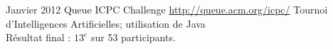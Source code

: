 \documentclass[11pt,a4paper]{moderncv}
\begin{document}

\cventry
{Janvier 2012}
{Queue ICPC Challenge}
{}
{\url{http://queue.acm.org/icpc/}}
{}
{Tournoi d'Intelligences Artificielles; utilisation de Java\\Résultat final : $13^{e}$ sur 53 participants.}

\renewcommand{\listitemsymbol}{-} %


\nocite{*}

\end{document}
